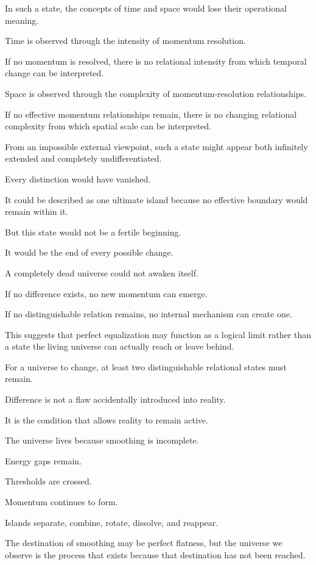 In such a state, the concepts of time and space would lose their operational meaning.

Time is observed through the intensity of momentum resolution.

If no momentum is resolved, there is no relational intensity from which temporal change can be interpreted.

Space is observed through the complexity of momentum-resolution relationships.

If no effective momentum relationships remain, there is no changing relational complexity from which spatial scale can be interpreted.

From an impossible external viewpoint, such a state might appear both infinitely extended and completely undifferentiated.

Every distinction would have vanished.

It could be described as one ultimate island because no effective boundary would remain within it.

But this state would not be a fertile beginning.

It would be the end of every possible change.

A completely dead universe could not awaken itself.

If no difference exists, no new momentum can emerge.

If no distinguishable relation remains, no internal mechanism can create one.

This suggests that perfect equalization may function as a logical limit rather than a state the living universe can actually reach or leave behind.

For a universe to change, at least two distinguishable relational states must remain.

Difference is not a flaw accidentally introduced into reality.

It is the condition that allows reality to remain active.

The universe lives because smoothing is incomplete.

Energy gaps remain.

Thresholds are crossed.

Momentum continues to form.

Islands separate, combine, rotate, dissolve, and reappear.

The destination of smoothing may be perfect flatness, but the universe we observe is the process that exists because that destination has not been reached.

